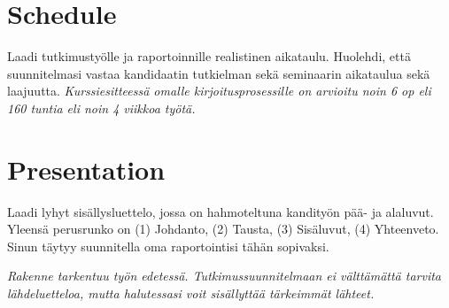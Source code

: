 \documentclass[12pt,a4paper,finnish,oneside]{article}
\begin{document}
\section{Schedule}

Laadi tutkimustyölle ja raportoinnille realistinen aikataulu.
Huolehdi, että suunnitelmasi vastaa kandidaatin tutkielman sekä
seminaarin aikataulua sekä laajuutta.  \emph{Kurssiesitteessä omalle
  kirjoitusprosessille on arvioitu noin 6 op eli 160 tuntia eli noin 4
  viikkoa työtä.}



\section{Presentation}

Laadi lyhyt sisällysluettelo, jossa on hahmoteltuna kandityön pää- ja
alaluvut. Yleensä perusrunko on
(1) Johdanto,
(2) Tausta,
(3) Sisäluvut,
(4) Yhteenveto.
%
Sinun täytyy suunnitella oma raportointisi tähän sopivaksi. 

\emph{Rakenne tarkentuu työn edetessä. Tutkimussuunnitelmaan ei välttämättä tarvita lähdeluetteloa, mutta halutessasi voit sisällyttää tärkeimmät lähteet.}


%


% 

\renewcommand{\refname}{Lähteet}  %



\end{document}

